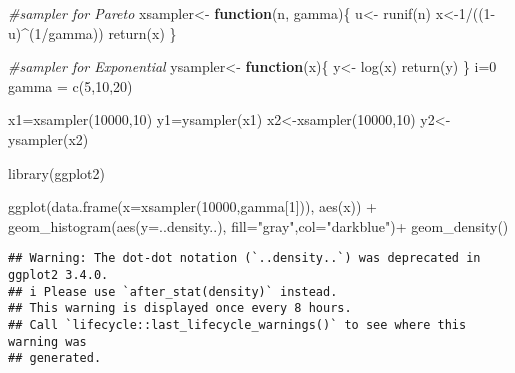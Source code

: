 \documentclass[
]{article}
\newenvironment{Shaded}{\begin{snugshade}}{\end{snugshade}}
\newcommand{\AttributeTok}[1]{\textcolor[rgb]{0.77,0.63,0.00}{#1}}
\newcommand{\CommentTok}[1]{\textcolor[rgb]{0.56,0.35,0.01}{\textit{#1}}}
\newcommand{\ControlFlowTok}[1]{\textcolor[rgb]{0.13,0.29,0.53}{\textbf{#1}}}
\newcommand{\DecValTok}[1]{\textcolor[rgb]{0.00,0.00,0.81}{#1}}
\newcommand{\FunctionTok}[1]{\textcolor[rgb]{0.00,0.00,0.00}{#1}}
\newcommand{\NormalTok}[1]{#1}
\newcommand{\OtherTok}[1]{\textcolor[rgb]{0.56,0.35,0.01}{#1}}
\newcommand{\SpecialCharTok}[1]{\textcolor[rgb]{0.00,0.00,0.00}{#1}}
\newcommand{\StringTok}[1]{\textcolor[rgb]{0.31,0.60,0.02}{#1}}
\begin{document}
\begin{Shaded}
\begin{Highlighting}[]
\CommentTok{\#sampler for Pareto}
\NormalTok{xsampler}\OtherTok{\textless{}{-}} \ControlFlowTok{function}\NormalTok{(n, gamma)\{}
\NormalTok{  u}\OtherTok{\textless{}{-}} \FunctionTok{runif}\NormalTok{(n)}
\NormalTok{  x}\OtherTok{\textless{}{-}}\DecValTok{1}\SpecialCharTok{/}\NormalTok{((}\DecValTok{1}\SpecialCharTok{{-}}\NormalTok{u)}\SpecialCharTok{\^{}}\NormalTok{(}\DecValTok{1}\SpecialCharTok{/}\NormalTok{gamma))}
  \FunctionTok{return}\NormalTok{(x)}
\NormalTok{\}}

\CommentTok{\#sampler for Exponential}
\NormalTok{ysampler}\OtherTok{\textless{}{-}} \ControlFlowTok{function}\NormalTok{(x)\{}
\NormalTok{  y}\OtherTok{\textless{}{-}} \FunctionTok{log}\NormalTok{(x)}
  \FunctionTok{return}\NormalTok{(y)}
\NormalTok{\}}
\NormalTok{i}\OtherTok{=}\DecValTok{0}
\NormalTok{gamma }\OtherTok{=} \FunctionTok{c}\NormalTok{(}\DecValTok{5}\NormalTok{,}\DecValTok{10}\NormalTok{,}\DecValTok{20}\NormalTok{)}

\NormalTok{x1}\OtherTok{=}\FunctionTok{xsampler}\NormalTok{(}\DecValTok{10000}\NormalTok{,}\DecValTok{10}\NormalTok{)}
\NormalTok{y1}\OtherTok{=}\FunctionTok{ysampler}\NormalTok{(x1)}
\NormalTok{x2}\OtherTok{\textless{}{-}}\FunctionTok{xsampler}\NormalTok{(}\DecValTok{10000}\NormalTok{,}\DecValTok{10}\NormalTok{)}
\NormalTok{y2}\OtherTok{\textless{}{-}} \FunctionTok{ysampler}\NormalTok{(x2)}

\FunctionTok{library}\NormalTok{(ggplot2)}

\FunctionTok{ggplot}\NormalTok{(}\FunctionTok{data.frame}\NormalTok{(}\AttributeTok{x=}\FunctionTok{xsampler}\NormalTok{(}\DecValTok{10000}\NormalTok{,gamma[}\DecValTok{1}\NormalTok{])), }\FunctionTok{aes}\NormalTok{(x)) }\SpecialCharTok{+}
  \FunctionTok{geom\_histogram}\NormalTok{(}\FunctionTok{aes}\NormalTok{(}\AttributeTok{y=}\NormalTok{..density..), }\AttributeTok{fill=}\StringTok{"gray"}\NormalTok{,}\AttributeTok{col=}\StringTok{"darkblue"}\NormalTok{)}\SpecialCharTok{+}
  \FunctionTok{geom\_density}\NormalTok{()}
\end{Highlighting}
\end{Shaded}

\begin{verbatim}
## Warning: The dot-dot notation (`..density..`) was deprecated in ggplot2 3.4.0.
## i Please use `after_stat(density)` instead.
## This warning is displayed once every 8 hours.
## Call `lifecycle::last_lifecycle_warnings()` to see where this warning was
## generated.
\end{verbatim}
\end{document}
